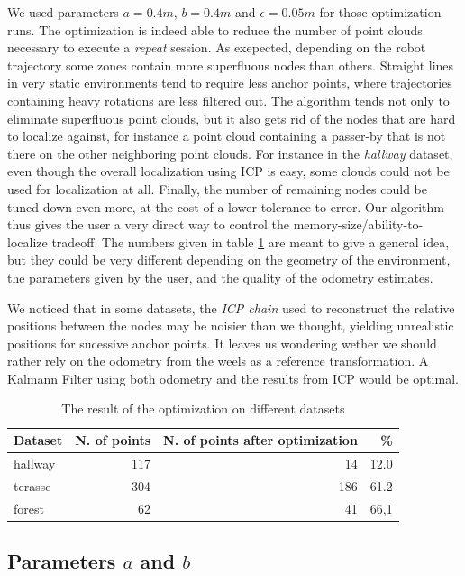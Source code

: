 \documentclass[letterpaper,10 pt,conference]{ieeeconf}
\begin{document}
We used parameters $a=0.4 m$, $b=0.4 m$ and $\epsilon=0.05 m$ for those optimization runs. The
optimization is indeed able to reduce the number of point clouds necessary to execute a
\textit{repeat} session. As exepected, depending on the robot trajectory some zones contain more
superfluous nodes than others. Straight lines in very static environments tend to require less
anchor points, where trajectories containing heavy rotations are less filtered out. The algorithm
tends not only to eliminate superfluous point clouds, but it also gets rid of the nodes that are
hard to localize against, for instance a point cloud containing a passer-by that is not there on the
other neighboring point clouds. For instance in the \textit{hallway} dataset, even though the
overall localization using ICP is easy, some clouds could not be used for localization at all.
Finally, the number of remaining nodes could be tuned down even more, at the cost of a lower
tolerance to error. Our algorithm thus gives the user a very direct way to control the
memory-size/ability-to-localize tradeoff. The numbers given in table
\ref{tabopti} are meant to give a general idea, but they could be very different depending on the
geometry of the environment, the parameters given by the user, and the quality of the odometry
estimates.

We noticed that in some datasets, the \textit{ICP chain} used to reconstruct the relative positions
between the nodes may be noisier than we thought, yielding unrealistic positions for sucessive
anchor points. It leaves us wondering wether we should rather rely on the odometry from the weels as
a reference transformation. A Kalmann Filter using both odometry and the results from ICP would be
optimal.

\begin{table}[h]
\centering
\begin{tabular}{|l|r|r|r|}
  \hline
Dataset & N. of points & N. of points after optimization & \% \\
\hline
  hallway & 117 & 14 & 12.0 \\
\hline
terasse & 304 & 186 & 61.2 \\
  \hline
forest & 62 & 41 & 66,1 \\
  \hline
\end{tabular}
\caption{The result of the optimization on different datasets}
\label{tabopti}
\end{table}


\subsection{Parameters $a$ and $b$}
\end{document}
